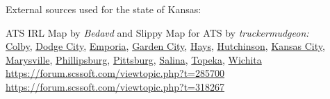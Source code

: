 





%









\vspace{2em}\footnoterule
{\footnotesize \noindent External sources used for the state of Kansas:
\begin{description}[
style=nextline,
leftmargin=1.1em,
labelsep=0pt,
parsep=0pt,
font=\normalfont,
]

\item[$\ast$]
ATS IRL Map by \textit{Bedavd} and Slippy Map for ATS by \textit{truckermudgeon:}\\
\hyperref[city:Colby]{Colby},
\hyperref[city:Dodge City]{Dodge City},
\hyperref[city:Emporia]{Emporia},
\hyperref[city:Garden City]{Garden City},
\hyperref[city:Hays]{Hays},
\hyperref[city:Hutchinson]{Hutchinson},
\hyperref[city:kansas_ci_ks]{Kansas City},
\hyperref[city:Marysville]{Marysville},
\hyperref[city:Phillipsburg]{Phillipsburg},
\hyperref[city:Pittsburg]{Pittsburg},
\hyperref[city:salina_ks]{Salina},
\hyperref[city:Topeka]{Topeka},
\hyperref[city:Wichita]{Wichita}
\\ \url{https://forum.scssoft.com/viewtopic.php?t=285700}
\\ \url{https://forum.scssoft.com/viewtopic.php?t=318267}

\end{description}
}
